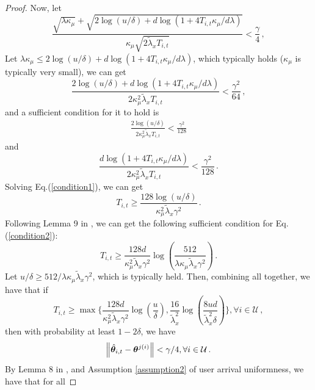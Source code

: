 \begin{proof}
Now, let
\begin{equation}
    \frac{\sqrt{\lambda \kappa_\mu}+\sqrt{2\log(u/\delta)+d\log(1+4T_{i,t}\kappa_\mu/d\lambda)}}{\kappa_\mu{\sqrt{2\tilde{\lambda}_x T_{i,t}}}}<\frac{\gamma}{4}\,,
\end{equation}
Let $\lambda \kappa_\mu\leq2\log(u/\delta)+d\log(1+4T_{i,t}\kappa_\mu/d\lambda)$, which typically holds ($\kappa_\mu$ is typically very small), we can get
\begin{equation}
        \frac{2\log(u/\delta)+d\log(1+4T_{i,t}\kappa_\mu/d\lambda)}{2\kappa_\mu^2{\tilde{\lambda}_x T_{i,t}}}<\frac{\gamma^2}{64}\,,
\end{equation}
and a sufficient condition for it to hold is
\begin{align}
     \frac{2\log(u/\delta)}{2\kappa_\mu^2{\tilde{\lambda}_x T_{i,t}}}<\frac{\gamma^2}{128}\label{condition1}
\end{align}
and 
\begin{equation}
    \frac{d\log(1+4T_{i,t}\kappa_\mu/d\lambda)}{2\kappa_\mu^2{\tilde{\lambda}_x T_{i,t}}}<\frac{\gamma^2}{128}\,.\label{condition2}
\end{equation}
Solving Eq.(\ref{condition1}), we can get
\begin{equation}
    T_{i,t}\geq \frac{128\log(u/\delta)}{\kappa_\mu^2\tilde{\lambda}_x\gamma^2}\,.
\end{equation}
Following Lemma 9 in \cite{li2018online}, we can get the following sufficient condition for Eq.(\ref{condition2}):
\begin{equation}
    T_{i,t}\geq \frac{128d}{\kappa_\mu^2\tilde\lambda_x\gamma^2}\log(\frac{512}{\lambda\kappa_\mu\tilde{\lambda}_x\gamma^2})\,.
\end{equation}
Let $u/\delta\geq 512/\lambda\kappa_\mu\tilde{\lambda}_x\gamma^2$, which is typically held. Then, combining all together, we have that if
\begin{equation}
    T_{i,t}\geq\max\{\frac{128d}{\kappa_\mu^2\tilde{\lambda}_x\gamma^2}\log(\frac{u}{\delta}),\frac{16}{\tilde{\lambda}_x^2}\log(\frac{8ud}{\tilde{\lambda}_x^2\delta})\}, \forall i\in \mathcal{U}\,, \label{condition final}
\end{equation}
then with probability at least $1-2\delta$, we have
\begin{equation}
    \left\| \hat{\boldsymbol{\theta}}_{i,t}-\boldsymbol{\theta}^{j(i)} \right\|<\gamma/4, \forall i\in\mathcal{U}\,.
\end{equation}
By Lemma 8 in \cite{li2018online}, and Assumption \ref{assumption2} of user arrival uniformness, we have that for all

\end{proof}
